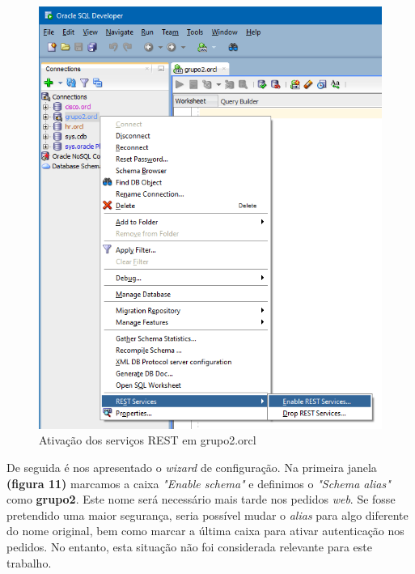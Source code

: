 \documentclass[a4paper]{article}
\begin{document}
\begin{figure}[H]
\centering
\includegraphics[scale=0.55]{REST/rest_grupo2_1.png}
\caption{Ativação dos serviços REST em grupo2.orcl}
\end{figure}

De seguida é nos apresentado o \emph{wizard} de configuração.
Na primeira janela \textbf{(figura 11)} marcamos a caixa \emph{"Enable schema"} e definimos o \emph{"Schema alias"} como \textbf{grupo2}. Este nome será necessário mais tarde nos pedidos \emph{web}. Se fosse pretendido uma maior segurança, seria possível mudar o \emph{alias} para algo diferente do nome original, bem como marcar a última caixa para ativar autenticação nos pedidos. No entanto, esta situação não foi considerada relevante para este trabalho.
\end{document}

